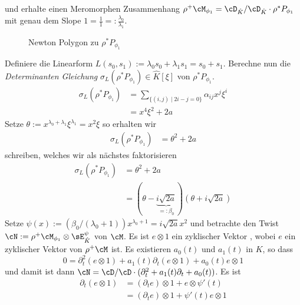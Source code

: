 \fi
und erhalte einen Meromorphen Zusammenhang $\rho^+\cM_{\phi_1}=\cD_{\hat
K}/\cD_{\hat K}\cdot\rho^*P_{\phi_1}$ mit genau dem Slope
$1=\frac{1}{1}=:\frac{\lambda_0}{\lambda_1}$.
\begin{figure}[H]
\caption{Newton Polygon zu $\rho^*P_{\phi_1}$}
\begin{center}
\end{center}
\end{figure}
\begin{try}
Definiere die Linearform $L(s_0,s_1):=\lambda_0s_0+\lambda_1s_1=s_0+s_1$.
Berechne nun die \emph{Determinanten Gleichung} $\sigma_L(\rho^*P_{\phi_1})\in
\hat K[\xi]$ von $\rho^*P_{\phi_1}$.
\begin{align*}
\sigma_L(\rho^*P_{\phi_1})
  &= \sum_{\{(i,j)\mid 2i-j=0\}}\alpha_{ij}x^{j}\xi^i\\
  &= x^4\xi^2 + 2a
\end{align*}
Setze $\theta:=x^{\lambda_0+\lambda_1}\xi^{\lambda_1}=x^2\xi$ so erhalten wir
\begin{align*}
\sigma_L(\rho^*P_{\phi_1}) &= \theta^2 + 2a
\end{align*}
schreiben, welches wir als nächstes faktorisieren
\begin{align*}
\sigma_L(\rho^*P_{\phi_1}) &= \theta^2+2a\\
  &=(\theta-\underset{=:\beta_0}{\underbrace{i\sqrt{2a}}})
    (\theta+i\sqrt{2a})
\end{align*}
Setze $\psi(x):=(\beta_0/(\lambda_0+1))x^{\lambda_0+1}=i\sqrt{2a}x^2$ und
betrachte den Twist $\cN:=\rho^+\cM_{\phi_1}\otimes\sE_{\hat K}^\psi$ von
$\cM$.
Es ist $e\otimes 1$ ein zyklischer Vektor , wobei $e$ ein zyklischer Vektor von
$\rho^+\cM$ ist.
Es existieren $a_0(t)$ und $a_1(t)$ in $K$, so dass
\[
0=\partial_t^2 (e\otimes 1) + a_1(t)\partial_t (e\otimes 1) + a_0(t) e\otimes 1
\]
und damit ist dann $\cN=\cD/\cD\cdot(\partial_t^2+a_1(t)\partial_t+a_0(t))$.
Es ist
\begin{align*}
\partial_t(e\otimes 1) &= (\partial_te)\otimes 1 + e\otimes \psi'(t) \\
  &= (\partial_te)\otimes 1 + \psi'(t) e\otimes 1 \\

\end{align*}
\end{try}
